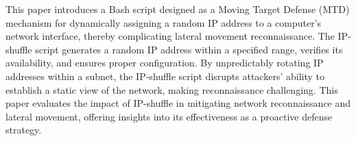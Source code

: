 This paper introduces a Bash script designed as a Moving Target Defense (MTD) mechanism for dynamically assigning a random IP address to a computer’s network interface, thereby complicating lateral movement reconnaissance. The IP-shuffle script generates a random IP address within a specified range, verifies its availability, and ensures proper configuration. By unpredictably rotating IP addresses within a subnet, the IP-shuffle script disrupts attackers’ ability to establish a static view of the network, making reconnaissance challenging. This paper evaluates the impact of IP-shuffle in mitigating network reconnaissance and lateral movement, offering insights into its effectiveness as a proactive defense strategy.